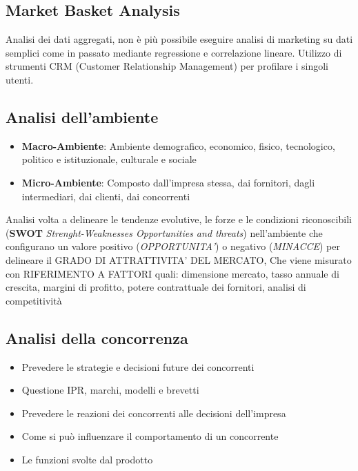 \documentclass[12pt]{article}
\begin{document}
\subsection{Market Basket Analysis}
Analisi dei dati aggregati, non è più possibile eseguire analisi di marketing su dati semplici come in passato mediante regressione e correlazione lineare.
Utilizzo di strumenti CRM (Customer Relationship Management) per profilare i singoli utenti.
\subsection{Analisi dell'ambiente}
\begin{itemize}
    \item \textbf{Macro-Ambiente}: Ambiente demografico, economico, fisico, tecnologico, politico e istituzionale, culturale e sociale
    \item \textbf{Micro-Ambiente}: Composto dall’impresa stessa, dai fornitori, dagli intermediari, dai clienti, dai concorrenti
\end{itemize}
Analisi volta a delineare le tendenze evolutive, le forze e le condizioni riconoscibili (\textbf{SWOT} \textit{Strenght-Weaknesses Opportunities and threats}) nell’ambiente che configurano un valore positivo (\textit{OPPORTUNITA’}) o negativo (\textit{MINACCE}) per delineare il GRADO DI ATTRATTIVITA’ DEL MERCATO, Che viene misurato con RIFERIMENTO A FATTORI quali: dimensione mercato, tasso annuale di crescita, margini di profitto, potere contrattuale dei fornitori, analisi di competitività
\subsection{Analisi della concorrenza}
\begin{itemize}
    \item Prevedere le strategie e decisioni future dei concorrenti
    \item Questione IPR, marchi, modelli e brevetti
    \item Prevedere le reazioni dei concorrenti alle decisioni dell’impresa
    \item Come si può influenzare il comportamento di un concorrente
    \item Le funzioni svolte dal prodotto
\end{itemize}
\end{document}
